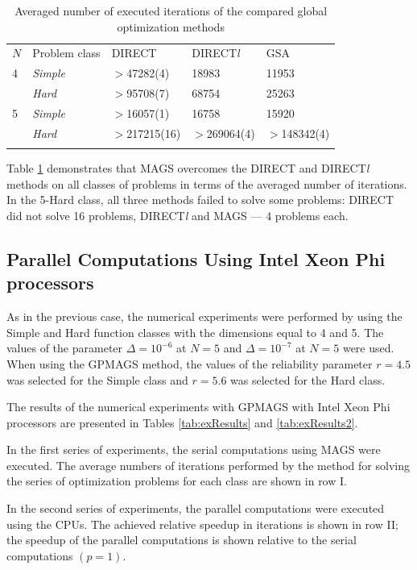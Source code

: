 \documentclass{aims}
\theoremstyle{definition}
\begin{document}
\begin{table}
  \caption{Averaged number of executed iterations of the compared global optimization methods}
  \label{tab:3}
  \center
  \begin{tabular}{lllll}
    \hline\noalign{\smallskip}
     $N$ & Problem class & DIRECT & DIRECT\textit{l} & GSA \\
    \noalign{\smallskip} \hline \noalign{\smallskip}
      4 &	\textit{Simple}	& $>$47282(4) &	18983 &	11953 \\
        & \textit{Hard} &	$>$95708(7) &	68754 &	25263 \\
      5	& \textit{Simple} &	$>$16057(1) &	16758 &	15920 \\
        & \textit{Hard} &	$>$217215(16) &	$>$269064(4) & $>$148342(4) \\
    \noalign{\smallskip}\hline
  \end{tabular}
\end{table}

Table \ref{tab:3} demonstrates that MAGS overcomes the DIRECT and DIRECT\textit{l} methods
on all classes of problems in terms of the averaged number of iterations.
In the 5-Hard class, all three methods failed to solve some problems: DIRECT did not
solve 16 problems, DIRECT\textit{l} and MAGS --- 4 problems each.

\subsection{Parallel Computations Using Intel Xeon Phi processors}
As in the previous case, the numerical experiments were performed by using the Simple
and Hard function classes with the dimensions equal to 4 and 5. The values of the
parameter \(\Delta=10^{-6}\) at \(N=5\) and \(\Delta=10^{-7}\) at \(N=5\) were used.
When using the GPMAGS method, the values of the reliability parameter \(r=4.5\) was
selected for the Simple class and \(r=5.6\) was selected for the Hard class.

The results of the numerical experiments with GPMAGS with Intel Xeon Phi processors are presented in Tables \ref{tab:exResults} and \ref{tab:exResults2}.

In the first series of experiments, the serial computations using MAGS were executed.
The average numbers of iterations performed by the method for solving the series of optimization problems
for each class are shown in row I.

In the second series of experiments, the parallel computations were executed using the CPUs.
The achieved relative speedup in iterations is shown in row II; the speedup of the
parallel computations is shown relative to the serial computations \((p=1)\).
\end{document}
